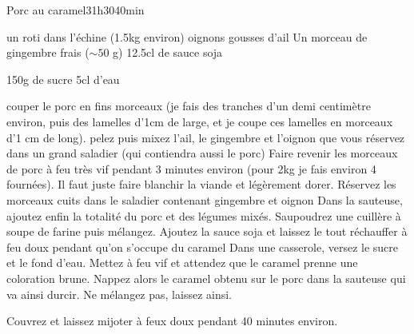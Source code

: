 \begin{recette}{Porc au caramel}{3}{1h30}{40min}

\begin{ingredients}
\ingredient un roti dans l'échine (1.5kg environ)
 oignons
 gousses d'ail
\ingredient Un morceau de gingembre frais ($\sim 50$ g)
\ingredient 12.5cl de sauce soja

\ingredient 150g de sucre
\ingredient 5cl d'eau
\end{ingredients}

\begin{preparation}
\etape couper le porc en fins morceaux (je fais des tranches d'un demi centimètre environ, puis des lamelles d'1cm de large, et
je coupe ces lamelles en morceaux d'1 cm de long).
\etape pelez puis mixez l'ail, le gingembre et l'oignon que vous réservez dans un grand saladier (qui contiendra aussi le porc)
\etape Faire revenir les morceaux de porc à feu très vif pendant 3 minutes environ (pour 2kg je fais environ 4 fournées). Il
faut juste faire blanchir la viande et légèrement dorer. Réservez les morceaux cuits dans le saladier contenant gingembre et
oignon
\etape Dans la sauteuse, ajoutez enfin la totalité du porc et des légumes mixés. 
\etape Saupoudrez une cuillère à soupe de farine puis mélangez. 
\etape Ajoutez la sauce soja et laissez le tout réchauffer à feu doux pendant qu'on s'occupe du caramel
\etape Dans une casserole, versez le sucre et le fond d'eau. Mettez à feu vif et attendez que le caramel prenne une coloration
brune.
\etape Nappez alors le caramel obtenu sur le porc dans la sauteuse qui va ainsi durcir. Ne mélangez pas, laissez ainsi.
\end{preparation}

\begin{cuisson}
Couvrez et laissez mijoter à feux doux pendant 40 minutes environ.
\end{cuisson}
\end{recette}

